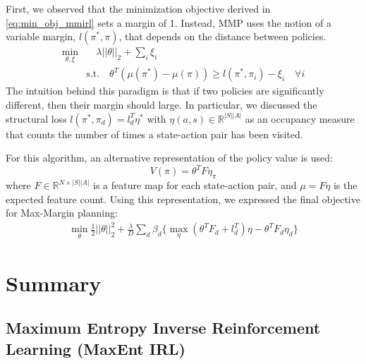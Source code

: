 \documentclass[11pt]{article}
\begin{document}
First, we observed that the minimization objective derived in \eqref{eq:min_obj_mmirl} sets a margin of 1. Instead, MMP uses the notion of a variable margin, $l(\pi^\ast, \pi)$,  that depends on the distance between policies. 
\begin{equation}
    \label{eq:min_obj_mmp}
    \begin{split}
        \min\limits_{\theta, \xi} & \quad\lambda ||\theta||_2 + \sum\limits_i \xi_i \\
        & \textrm{s.t.} \quad {\theta}^T({\mu}(\pi^\ast) - {\mu}(\pi)) \geq l(\pi^\ast, \pi_i) - \xi_i \quad \forall i
    \end{split}
\end{equation}
The intuition behind this paradigm is that if two policies are significantly different, then their margin should large. In particular, we discussed the structural loss $l(\pi^\ast, \pi_d) = l_d^T \eta^\ast$ with $\eta(a, s) \in \mathbb{R}^{|S||A|}$ as an occupancy measure that counts the number of times a state-action pair has been visited. 

For this algorithm, an alternative representation of the policy value is used:
\begin{equation}
    V(\pi) = {\theta}^{T} F \eta_\pi
\end{equation}
where $F \in \mathbb{R}^{N \times |S||A|}$ is a feature map for each state-action pair, and $\mu = F\eta$ is the expected feature count. Using this representation, we expressed the final objective for Max-Margin planning:
\begin{equation}
    \label{eq:final_min_obj_mmp}
    \begin{split}
        \min\limits_{\theta} \frac{1}{2}||{\theta}||_2^2
        + \frac{\lambda}{D} \sum\limits_d \beta_d \big\{ \max\limits_\eta({\theta}^T F_d + l_d^T)\eta  - {\theta}^T F_d \eta_d \big\}
    \end{split}
\end{equation}


\section{Summary}

\subsection{Maximum Entropy Inverse Reinforcement Learning (MaxEnt IRL)}
\end{document}
